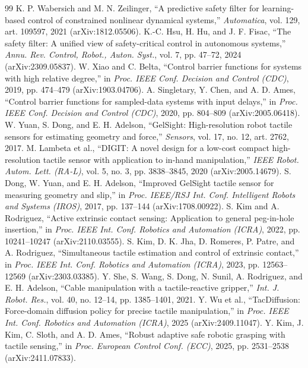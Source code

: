 \documentclass[letterpaper,10pt,conference]{IEEEtran}
\begin{document}
\begin{thebibliography}{99}
K. P. Wabersich and M. N. Zeilinger, ``A predictive safety filter for learning-based control of constrained nonlinear dynamical systems,'' \emph{Automatica}, vol. 129, art. 109597, 2021 (arXiv:1812.05506).
K.-C. Hsu, H. Hu, and J. F. Fisac, ``The safety filter: A unified view of safety-critical control in autonomous systems,'' \emph{Annu. Rev. Control, Robot., Auton. Syst.}, vol. 7, pp. 47--72, 2024 (arXiv:2309.05837).
W. Xiao and C. Belta, ``Control barrier functions for systems with high relative degree,'' in \emph{Proc. IEEE Conf. Decision and Control (CDC)}, 2019, pp. 474--479 (arXiv:1903.04706).
A. Singletary, Y. Chen, and A. D. Ames, ``Control barrier functions for sampled-data systems with input delays,'' in \emph{Proc. IEEE Conf. Decision and Control (CDC)}, 2020, pp. 804--809 (arXiv:2005.06418).
W. Yuan, S. Dong, and E. H. Adelson, ``GelSight: High-resolution robot tactile sensors for estimating geometry and force,'' \emph{Sensors}, vol. 17, no. 12, art. 2762, 2017.
M. Lambeta et al., ``DIGIT: A novel design for a low-cost compact high-resolution tactile sensor with application to in-hand manipulation,'' \emph{IEEE Robot. Autom. Lett. (RA-L)}, vol. 5, no. 3, pp. 3838--3845, 2020 (arXiv:2005.14679).
S. Dong, W. Yuan, and E. H. Adelson, ``Improved GelSight tactile sensor for measuring geometry and slip,'' in \emph{Proc. IEEE/RSJ Int. Conf. Intelligent Robots and Systems (IROS)}, 2017, pp. 137--144 (arXiv:1708.00922).
S. Kim and A. Rodriguez, ``Active extrinsic contact sensing: Application to general peg-in-hole insertion,'' in \emph{Proc. IEEE Int. Conf. Robotics and Automation (ICRA)}, 2022, pp. 10241--10247 (arXiv:2110.03555).
S. Kim, D. K. Jha, D. Romeres, P. Patre, and A. Rodriguez, ``Simultaneous tactile estimation and control of extrinsic contact,'' in \emph{Proc. IEEE Int. Conf. Robotics and Automation (ICRA)}, 2023, pp. 12563--12569 (arXiv:2303.03385).
Y. She, S. Wang, S. Dong, N. Sunil, A. Rodriguez, and E. H. Adelson, ``Cable manipulation with a tactile-reactive gripper,'' \emph{Int. J. Robot. Res.}, vol. 40, no. 12--14, pp. 1385--1401, 2021.
Y. Wu et al., ``TacDiffusion: Force-domain diffusion policy for precise tactile manipulation,'' in \emph{Proc. IEEE Int. Conf. Robotics and Automation (ICRA)}, 2025 (arXiv:2409.11047).
Y. Kim, J. Kim, C. Sloth, and A. D. Ames, ``Robust adaptive safe robotic grasping with tactile sensing,'' in \emph{Proc. European Control Conf. (ECC)}, 2025, pp. 2531--2538 (arXiv:2411.07833).
\end{thebibliography}
\end{document}
